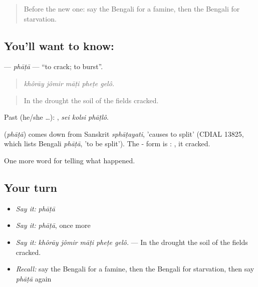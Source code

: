 \begin{quote}
Before the new one: say the Bengali for a famine, then the Bengali for starvation.
\end{quote}

\subsection*{You'll want to know: }
\textbf{} — \emph{phāṭā} — \textquotedblleft{}to crack; to burst\textquotedblright{}.

\begin{quote}
    
\end{quote}

\begin{quote}
\emph{khôrāy jômir māṭi pheṭe gelô.}
\end{quote}

\begin{quote}
In the drought the soil of the fields cracked.
\end{quote}

Past (he/she …):   , \emph{sei kolsi phāṭlô}.

\begin{cousinweb}
\textbf{} (\emph{phāṭā}) comes down from Sanskrit \emph{sphāṭayati}, 'causes to split' (CDIAL 13825, which lists Bengali \emph{phāṭā}, 'to be split'). The - form is :  , it cracked.
\end{cousinweb}

\begin{grammarlens}[title={What you've built}]
One more word for telling what happened.
\end{grammarlens}

\subsection*{Your turn}
\begin{itemize}
\raggedright
  \item \emph{Say it:} \emph{phāṭā}
  \item \emph{Say it:} \emph{phāṭā}, once more
  \item \emph{Say it:} \emph{khôrāy jômir māṭi pheṭe gelô.} — In the drought the soil of the fields cracked.
  \item \emph{Recall:} say the Bengali for a famine, then the Bengali for starvation, then say \emph{phāṭā} again
\end{itemize}

